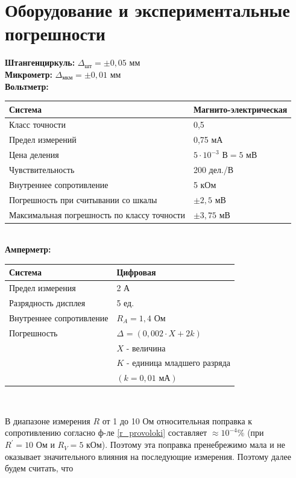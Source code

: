 \documentclass[a4paper,12pt]{article} %
\begin{document}
\section{Оборудование и экспериментальные погрешности}

\textbf{Штангенциркуль:} $\Delta_\text{шт} = \pm 0,05$ мм \\
\textbf{Микрометр:} $\Delta_\text{мкм} = \pm 0,01$ мм \\
\textbf{Вольтметр:} 

\begin{tabular}[]{|l|l|}
\hline
Система & Магнито-электрическая \\
\hline
Класс точности & 0,5 \\
\hline
Предел измерений & 0,75 мА  \\
\hline
Цена деления & $5 \cdot 10^{-3} \text{ В} = 5 \text{ мВ}$  \\
\hline
Чувствительность& 200 дел./В \\
\hline
Внутреннее сопротивление& 5 кОм  \\
\hline
Погрешность при считывании со шкалы& $\pm2,5\text{ мВ}$  \\
\hline
Максимальная погрешность по классу точности& $\pm3,75\text{ мВ}$ \\
\hline
\end{tabular}\\

\noindent \textbf{Амперметр:}

\begin{tabular}{|l|l|}
	\hline
	Система&Цифровая \\
	\hline
	Предел измерения&2 А \\
	\hline
	Разрядность дисплея& 5 ед. \\
	\hline
	Внутреннее сопротивление& $R_A = 1,4 \text{ Ом}$ \\
	\hline
	Погрешность& $\Delta_\text{} = (0,002 \cdot X + 2k)$ \\ & $X$ - величина \\ & $K$ - единица младшего разряда \\ & $(k = 0,01 \text{ мА})$ \\
	\hline
\end{tabular}\\

\medskip

В диапазоне измерения $R$ от 1 до 10 Ом относительная поправка 
к сопротивлению согласно ф-ле \eqref{r_provoloki} составляет $\approx 10^{-4} \% $ (при $ R^\prime=10 \text{ Ом} $ и $ R_V = 5 \text{ кОм} $). Поэтому эта поправка пренебрежимо мала и не оказывает значительного влияния на последующие измерения. Поэтому далее будем считать, что
\end{document}
